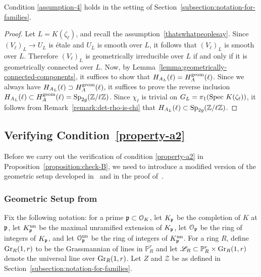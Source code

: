 \begin{proposition} \label{proposition:verifying-assumptions}
Condition \ref{assumption-4} holds in the setting of Section~\ref{subsection:notation-for-families}.
\end{proposition}
\begin{proof}
Let $L = K(\zeta_\ell)$, and recall the assumption~\eqref{thatswhatpeoplesay}. Since $(V_\ell)_L \to U_L$ is \'etale and $U_L$ is smooth over $L$, it follows that $(V_\ell)_L$ is smooth over $L$. Therefore $(V_\ell)_L$ is geometrically irreducible over $L$ if and only if it is geometrically connected over $L$. Now, by Lemma~\ref{lemma:geometrically-connected-components}, it suffices to show that $H_{A_L}(\ell) = H_A^{\operatorname{geom}}(\ell)$.
Since we always have $H_{A_L}(\ell) \supset H_A^{\operatorname{geom}}(\ell)$, it suffices to prove the reverse inclusion $H_{A_L}(\ell) \subset H_A^{\operatorname{geom}}(\ell) = \operatorname{Sp}_{2g} (\mathbb Z/\ell \mathbb Z)$.
Since $\chi_\ell$ is trivial on $G_L = \pi_1(\text{Spec } K(\zeta_\ell))$, it follows from
Remark~\ref{remark:det-rho-is-chi}
that $H_{A_L}(\ell) \subset \operatorname{Sp}_{2g}(\mathbb Z/\ell \mathbb Z)$.
\end{proof}

\subsection{Verifying Condition~\ref{property-a2}}\label{ver2}

Before we carry out the verification of condition \ref{property-a2} in Proposition~\ref{proposition:check-B},
we need to introduce a modified version of the geometric setup developed in~\cite[Subsection 5.2]{zywina2010hilbert}
and in the proof of~\cite[Theorem 5.3]{zywina2010hilbert}.

\subsubsection{Geometric Setup from~\cite{zywina2010hilbert}}
\label{subsubsection:geometric-setup}
Fix the following notation: for a prime $\mathfrak p \subset \mathcal O_K$, let $K_\mathfrak p$ be the completion of $K$ at $\mathfrak p$, let $K_\mathfrak p^{\operatorname{un}}$ be the maximal unramified extension of $K_\mathfrak p$, let $\mathcal O_\mathfrak p$ be the ring of integers of $K_\mathfrak p$, and let $\mathcal O_\mathfrak p^{\operatorname{un}}$ be the ring of integers of $K_\mathfrak p^{\operatorname{un}}$. For a ring $R$, define $\operatorname{Gr}_{R}(1,r)$ to be the Grassmannian of lines in $\mathbb P^r_{R}$ and let $\mathscr L_R \subset \mathbb P^r_R \times \operatorname{Gr}_{R}(1,r)$ denote the universal
line over $\operatorname{Gr}_{R}(1,r)$. Let $Z$ and $\mathcal Z$ be as defined in Section~\ref{subsection:notation-for-families}.

